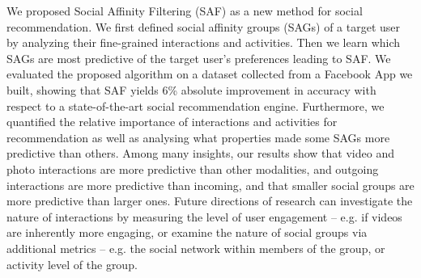 
We proposed Social Affinity Filtering (SAF) as a new method for social
recommendation.  We first defined social affinity groups (SAGs) of a
target user by analyzing their fine-grained interactions and
activities.  Then we learn which SAGs are most predictive of the
target user's preferences leading to SAF.  We evaluated the proposed
algorithm on a dataset collected from a Facebook App we built, showing
that SAF yields 6\% absolute improvement in accuracy with respect to a
state-of-the-art social recommendation engine.  Furthermore, we
quantified the relative importance of interactions and activities for
recommendation as well as analysing what properties made some SAGs
more predictive than others.  Among many insights, our results show
that video and photo interactions are more predictive than other
modalities, and outgoing interactions are more predictive than
incoming, and that smaller social groups are more predictive than
larger ones.  Future directions of research can investigate the nature
of interactions by measuring the level of user engagement -- e.g. if
videos are inherently more engaging, or examine the nature of social
groups via additional metrics -- e.g. the social network within
members of the group, or activity level of the group.
